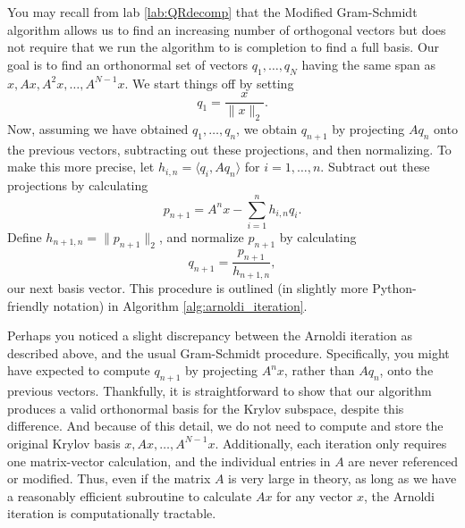 You may recall from lab \ref{lab:QRdecomp} that the Modified Gram-Schmidt algorithm allows us to find an increasing number of orthogonal
vectors but does not require that we run the algorithm to is completion to find a full basis.
Our goal is to find an orthonormal set of vectors $q_1,\ldots,q_N$ having the same span as $x, Ax, A^2x, \ldots, A^{N-1} x$.
We start
 things off by setting
\[
q_1 = \frac{x}{\|x\|_2}.
\]
Now, assuming we have obtained $q_1,\ldots,q_n$, we obtain $q_{n+1}$ by projecting $A q_n$ onto the previous vectors,
subtracting out these projections, and then normalizing. To make this more precise, let $h_{i,n} = \langle q_i, A q_n\rangle$
for $i = 1,\ldots, n$. Subtract out these projections by calculating
\[
p_{n+1} = A^n x - \sum_{i=1}^n h_{i,n}q_i.
\]
Define $h_{n+1,n} = \|p_{n+1}\|_2$, and normalize $p_{n+1}$ by calculating
\[
q_{n+1} = \frac{p_{n+1}}{h_{n+1,n}},
\]
our next basis vector. This procedure is outlined (in slightly more Python-friendly notation) in Algorithm \ref{alg:arnoldi_iteration}.

Perhaps you noticed a slight discrepancy between the Arnoldi iteration as described above, and the usual Gram-Schmidt procedure.
Specifically, you might have expected to compute $q_{n+1}$ by projecting $A^n x$, rather than $A q_n$, onto the previous vectors.
Thankfully, it is straightforward to show that our algorithm produces a valid orthonormal basis for the Krylov subspace,
despite this difference. And because of this detail, we do not need to compute and store the original Krylov basis
$x, Ax, \ldots, A^{N-1}x$.
Additionally, each iteration only requires one matrix-vector calculation, and the individual entries in $A$ are never
referenced or modified. Thus, even if the matrix $A$ is very large in theory, as long as we have a reasonably efficient
subroutine to calculate $Ax$ for any vector $x$, the Arnoldi iteration is computationally tractable.

